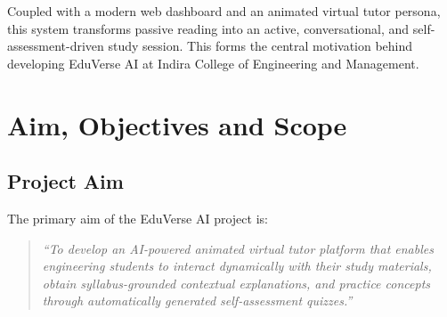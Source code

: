 \documentclass[11pt,a4paper]{report}
\begin{document}
Coupled with a modern web dashboard and an animated virtual tutor persona, this system transforms passive reading into an active, conversational, and self-assessment-driven study session. This forms the central motivation behind developing EduVerse AI at Indira College of Engineering and Management.
\clearpage

\chapter{Aim, Objectives and Scope}
\label{ch:aim_obj}

\section{Project Aim}
The primary aim of the EduVerse AI project is:
\begin{quote}
    \itshape
    ``To develop an AI-powered animated virtual tutor platform that enables engineering students to interact dynamically with their study materials, obtain syllabus-grounded contextual explanations, and practice concepts through automatically generated self-assessment quizzes.''
\end{quote}
\end{document}
